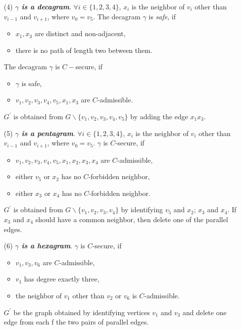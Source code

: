 \begin{itemize}
    \item[(4)] \textit{\textbf{$\gamma$ is a decagram}}. $\forall i \in \{1, 2, 3, 4\}$, $x_i$ is the neighbor of $v_i$ other than $v_{i-1}$ and $v_{i+1}$, where $v_0 = v_5$. The decagram $\gamma$ is \textit{safe}, if 
    \begin{itemize}
        \item $x_1, x_3$ are distinct and non-adjacent,
        \item there is no path of length two between them.
    \end{itemize}
    The decagram $\gamma$ is $C-$secure, if 
    \begin{itemize}
        \item $\gamma$ is safe,
        \item $v_1, v_2, v_3, v_4, v_5, x_1, x_3$ are $C$-admissible.
    \end{itemize}
    $G^{'}$ is obtained from $G \backslash \{v_1, v_2, v_3, v_4, v_5\}$ by adding the edge $x_1x_3$.
    
    \item[(5)] \textit{\textbf{$\gamma$ is a pentagram}}. $\forall i \in \{1, 2, 3, 4\}$, $x_i$ is the neighbor of $v_i$ other than $v_{i-1}$ and $v_{i+1}$, where $v_0 = v_5$.
    $\gamma$ is $C$-secure, if 
        \begin{itemize}
            \item $v_1, v_2, v_3, v_4, v_5, x_1, x_2, x_3, x_4$ are $C$-admissible,
            \item either $v_5$ or $x_2$ has no $C$-forbidden neighbor,
            \item either $x_3$ or $x_4$ has no $C$-forbidden neighbor.
        \end{itemize}
    $G^{'}$ is obtained from $G \backslash \{v_1, v_2, v_3, v_4\}$ by identifying $v_5$ and $x_2$; $x_3$ and $x_4$. If $x_3$ and $x_4$ should have a common neighbor, then delete one of the parallel edges.  
    
    \item[(6)] \textit{\textbf{$\gamma$ is a hexagram}}. $\gamma$ is $C$-secure, if
    \begin{itemize}
        \item $v_1, v_3, v_6$ are $C$-admissible,
        \item $v_1$ has degree exactly three,
        \item the neighbor of $v_1$ other than $v_2$ or $v_6$ is $C$-admissible.
    \end{itemize}
    $G^{'}$ be the graph obtained by identifying vertices $v_1$ and $v_3$ and delete one edge from each f the two pairs of parallel edges. 
\end{itemize}

